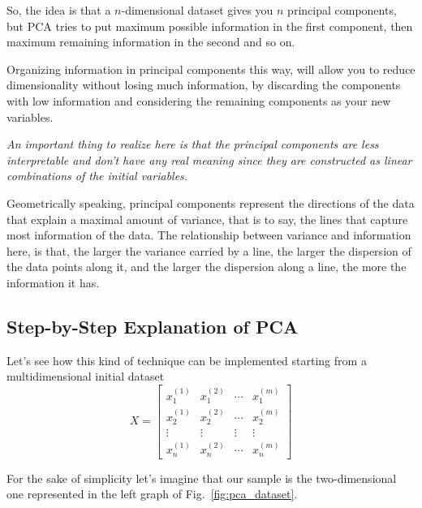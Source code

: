 \begin{enumerate}
So, the idea is that a $n$-dimensional dataset gives you $n$ principal components, but PCA tries to put maximum possible information in the first component, then maximum remaining information in the second and so on.

Organizing information in principal components this way, will allow you to reduce dimensionality without losing much information, by discarding the components with low information and considering the remaining components as your new variables.

\emph{An important thing to realize here is that the principal components are less interpretable and don’t have any real meaning since they are constructed as linear combinations of the initial variables.}

Geometrically speaking, principal components represent the directions of the data that explain a maximal amount of variance, that is to say, the lines that capture most information of the data. The relationship between variance and information here, is that, the larger the variance carried by a line, the larger the dispersion of the data points along it, and the larger the dispersion along a line, the more the information it has.

\subsection{Step-by-Step Explanation of PCA}

Let's see how this kind of technique can be implemented starting from a multidimensional initial dataset 
\begin{equation}
	X=\begin{bmatrix}
		x^{(1)}_1 &x^{(2)}_1&\cdots &x^{(m)}_1 \\
		x^{(1)}_2 &x^{(2)}_2&\cdots &x^{(m)}_2 \\
		\vdots &\vdots &\vdots &\vdots \\
		x^{(1)}_n &x^{(2)}_n&\cdots &x^{(m)}_n 
	\end{bmatrix}
\end{equation}

For the sake of simplicity let's imagine that our sample is the two-dimensional one represented in the left graph of Fig.~\ref{fig:pca_dataset}.


\end{enumerate}
